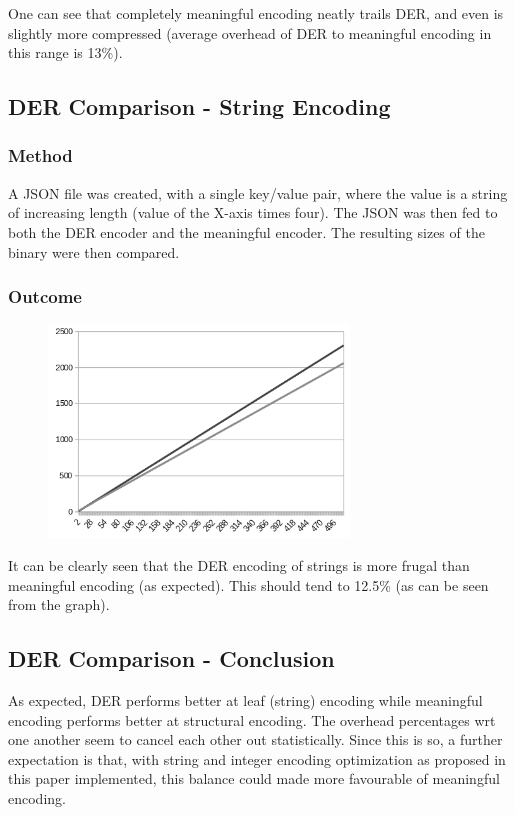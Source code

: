 One can see that completely meaningful encoding neatly trails DER, and
even is slightly more compressed (average overhead of DER to meaningful
encoding in this range is 13\%).

\subsection{DER Comparison - String Encoding}

\subsubsection{Method}

A JSON file was created, with a single key/value pair, where the value
is a string of increasing length (value of the X-axis times four).
The JSON was then fed to both the DER
encoder and the meaningful encoder. The resulting sizes of the binary were
then compared.

\subsubsection{Outcome}

\begin{figure}[H]
\centering
\includegraphics[width=80mm]{stringcomparison}
\end{figure}

It can be clearly seen that the DER encoding of strings is more
frugal than meaningful encoding (as expected). This should tend to
12.5\% (as can be seen from the graph).

\subsection{DER Comparison - Conclusion}

As expected, DER performs better at leaf (string) encoding while
meaningful encoding performs better at structural encoding.
The overhead percentages wrt one another seem to cancel each other
out statistically. Since this is so, a further expectation is that, with string
and integer encoding optimization as proposed in this paper implemented,
this balance could made more favourable of meaningful encoding.


